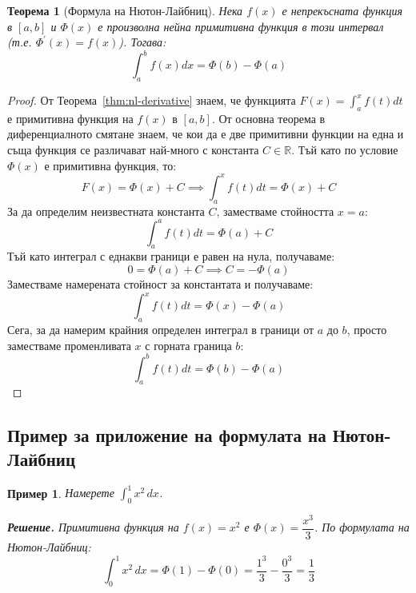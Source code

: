 \documentclass{scrartcl}
\newtheorem{theorem}{Теорема}
\newtheorem{example}{Пример}
\begin{document}
\begin{FlushLeft}
\begin{theorem}[Формула на Нютон-Лайбниц]
Нека $f(x)$ е непрекъсната функция в $[a, b]$ и $\Phi(x)$ е произволна нейна примитивна функция в този интервал (т.е. $\Phi^{\prime}(x) = f(x)$). Тогава:
\[ \int_a^b f(x)dx = \Phi(b) - \Phi(a) \]
\end{theorem}

\begin{proof}
От Теорема~\ref{thm:nl-derivative} знаем, че функцията $F(x) = \int_a^x f(t)dt$ е примитивна функция на $f(x)$ в $[a, b]$. От основна теорема в диференциалното смятане знаем, че кои да е две примитивни функции на една и съща функция се различават най-много с константа $C \in \mathbb{R}$. Тъй като по условие $\Phi(x)$ е примитивна функция, то:
\[ F(x) = \Phi(x) + C \implies \int_a^x f(t)dt = \Phi(x) + C \]
За да определим неизвестната константа $C$, заместваме стойността $x = a$:
\[ \int_a^a f(t)dt = \Phi(a) + C \]
Тъй като интеграл с еднакви граници е равен на нула, получаваме:
\[ 0 = \Phi(a) + C \implies C = -\Phi(a) \]
Заместваме намерената стойност за константата и получаваме:
\[ \int_a^x f(t)dt = \Phi(x) - \Phi(a) \]
Сега, за да намерим крайния определен интеграл в граници от $a$ до $b$, просто заместваме променливата $x$ с горната граница $b$:
\[ \int_a^b f(t)dt = \Phi(b) - \Phi(a) \]
\end{proof}

\subsection*{Пример за приложение на формулата на Нютон-Лайбниц}

\begin{example}
Намерете $\displaystyle\int_0^1 x^2\,dx$.

\textbf{Решение.} Примитивна функция на $f(x) = x^2$ е $\Phi(x) = \dfrac{x^3}{3}$. По формулата на Нютон-Лайбниц:
\[
\int_0^1 x^2\,dx = \Phi(1) - \Phi(0) = \frac{1^3}{3} - \frac{0^3}{3} = \frac{1}{3}
\]
\end{example}

\end{FlushLeft}
\end{document}
